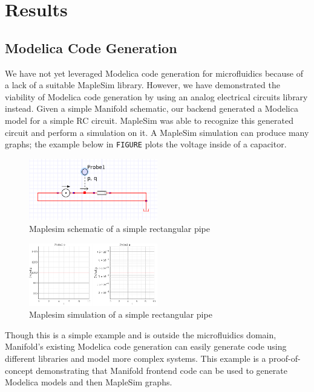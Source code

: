 \section{Results}

\subsection{Modelica Code Generation}

We have not yet leveraged Modelica code generation for microfluidics because of a lack of a suitable MapleSim library.
However, we have demonstrated the viability of Modelica code generation by using an
analog electrical circuits library instead. Given a simple Manifold schematic, our backend generated a Modelica model for a simple RC circuit.
MapleSim was able to recognize this generated circuit and perform a simulation on it.
A MapleSim simulation can produce many graphs; the example below in {\tt FIGURE} plots the voltage inside of a capacitor.

\begin{figure}[ht]
  \caption{Maplesim schematic of a simple rectangular pipe}
  \centering
    \includegraphics[width=0.5\textwidth]{img/simple-pipe.png}
\end{figure}
\begin{figure}[ht]
  \caption{Maplesim simulation of a simple rectangular pipe}
  \centering
    \includegraphics[width=0.5\textwidth]{img/simple-pipe-simulation.png}
\end{figure}


Though this is a simple example and is outside the microfluidics domain, Manifold's
existing Modelica code generation can easily generate code using different libraries
and model more complex systems.
This example is a proof-of-concept demonstrating that Manifold frontend code can be used to generate Modelica models and then MapleSim graphs.

